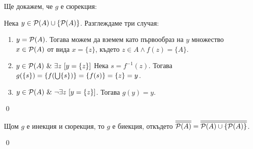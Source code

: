 \quad
Ще докажем, че $g$ е сюрекция:
\begin{tcolorbox}[mybox={Доказателство:}]
\quad
Нека $y \in \mathcal{P}(A) \cup \{\mathcal{P}(A)\}$.
Разглеждаме три случая:
\begin{enumerate}[label={\arabic* сл.}]
\item
$y = \mathcal{P}(A)$. Тогава можем да вземем като първообраз на $y$ множество $x \in \mathcal{P}(A)$ от вида $x = \{z\}$,
където $z \in A \land f(z) = \{A\}$.

\item
$y \in \mathcal{P}(A) \ \&\  \exists z\ [y = \{z\}]$
Нека $s = f^{-1}(z)$. Тогава $g(\{s\}) = \{f(\bigcup \{s\})\} = \{f(s)\} = \{z\} = y$.

\item
$y \in \mathcal{P}(A) \ \&\  \neg \exists z\ [y = \{z\}]$.
Тогава $g(y) = y$.
\end{enumerate}
\qed
\end{tcolorbox}

\quad
Щом $g$ е инекция и сюрекция, то $g$ е биекция, откъдето
$\overline{\overline{\mathcal{P}(A)}} = \overline{\overline{\mathcal{P}(A) \cup \{\mathcal{P}(A)\}}}$.

\qed

